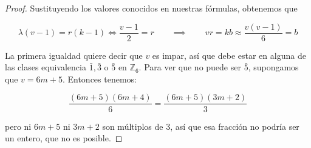 \begin{proof}
Sustituyendo los valores conocidos en
nuestras fórmulas, obtenemos que

$$
\lambda(v-1) = r(k-1)\iff \frac{v-1}{2} = r
\qquad\implies \qquad vr = kb\approx
\frac{v(v-1)}{6} = b
$$

La primera igualdad quiere decir que $v$ es
impar, así que debe estar en alguna de las
clases equivalencia $\bar{1},\bar{3}$ o
$\bar{5}$ en $\mathbb{Z}_6$. Para ver que no
puede
ser $\bar{5}$, supongamos que $v = 6m + 5$.
Entonces tenemos:

$$
\frac{(6m+5)(6m+4)}{6}=\frac{(6m+5)(3m+2)}{3}
$$

pero ni $6m + 5$ ni $3m + 2$ son múltiplos de
$3$, así que esa fracción no podría ser un
entero, que no es posible.
\end{proof}




